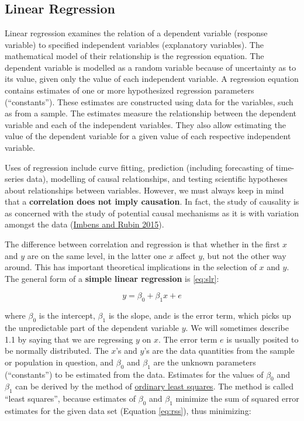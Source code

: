\documentclass[
]{article}
\begin{document}
~

~

~

\hypertarget{linear-regression}{%
\subsection{Linear Regression}\label{linear-regression}}

Linear regression examines the relation of a dependent variable
(response variable) to specified independent variables (explanatory
variables). The mathematical model of their relationship is the
regression equation. The dependent variable is modelled as a random
variable because of uncertainty as to its value, given only the value of
each independent variable. A regression equation contains estimates of
one or more hypothesized regression parameters (``constants''). These
estimates are constructed using data for the variables, such as from a
sample. The estimates measure the relationship between the dependent
variable and each of the independent variables. They also allow
estimating the value of the dependent variable for a given value of each
respective independent variable.

Uses of regression include curve fitting, prediction (including
forecasting of time-series data), modelling of causal relationships, and
testing scientific hypotheses about relationships between variables.
However, we must always keep in mind that a \textbf{correlation does not imply
causation}. In fact, the study of causality is as concerned with the
study of potential causal mechanisms as it is with variation amongst the
data (\protect\hyperlink{ref-Imbens2015}{Imbens and Rubin 2015}).

The difference between correlation and regression is that whether in the
first \(x\) and \(y\) are on the same level, in the latter one \(x\) affect
\(y\), but not the other way around. This has important theoretical
implications in the selection of \(x\) and \(y\). The general form of a
\textbf{simple linear regression} is \eqref{eq:slr}:

\begin{equation}
y=\beta_0+\beta_1x+e
\label{eq:slr}
\end{equation}

where \(\beta_0\) is the intercept, \(\beta_1\) is the slope, and\(e\) is the
error term, which picks up the unpredictable part of the dependent
variable \(y\). We will sometimes describe 1.1 by saying that we are
regressing \(y\) on \(x\). The error term \(e\) is usually posited to be
normally distributed. The \(x\)'s and \(y\)'s are the data quantities from
the sample or population in question, and \(\beta_0\) and \(\beta_1\) are
the unknown parameters (``constants'') to be estimated from the data.
Estimates for the values of \(\beta_0\) and \(\beta_1\) can be derived by
the method of \ul{ordinary least squares}. The method is called
``least squares'', because estimates of \(\beta_0\) and \(\beta_1\) minimize
the sum of squared error estimates for the given data set (Equation \eqref{eq:rss}), thus
minimizing:
\end{document}
